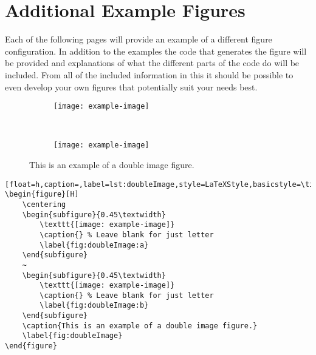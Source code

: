 \chapter{Additional Example Figures}\label{app:examplefigures}
	Each of the following pages will provide an example of a different figure configuration. 
	In addition to the examples the code that generates the figure will be provided and explanations of what the different parts of the code do will be included.
	From all of the included information in this  it should be possible to even develop your own figures that potentially suit your needs best.
		
		\clearpage



		\vspace*{\fill}
		\begin{figure}[H]
			\centering
			\begin{subfigure}{0.45\textwidth}
				\texttt{[image: example-image]}
				\caption{} %
				\label{fig:doubleImage:a}
			\end{subfigure}
			~
			\begin{subfigure}{0.45\textwidth}
				\texttt{[image: example-image]}
				\caption{} %
				\label{fig:doubleImage:b}
			\end{subfigure}
			\caption{This is an example of a double image figure.}
			\label{fig:doubleImage}
		\end{figure}
		\begin{lstlisting}[float=h,caption=,label=lst:doubleImage,style=LaTeXStyle,basicstyle=\tiny\ttfamily,]
\begin{figure}[H]
	\centering
	\begin{subfigure}{0.45\textwidth}
		\texttt{[image: example-image]}
		\caption{} % Leave blank for just letter
		\label{fig:doubleImage:a}
	\end{subfigure}
	~
	\begin{subfigure}{0.45\textwidth}
		\texttt{[image: example-image]}
		\caption{} % Leave blank for just letter
		\label{fig:doubleImage:b}
	\end{subfigure}
	\caption{This is an example of a double image figure.}
	\label{fig:doubleImage}
\end{figure}
		\end{lstlisting}
		\vspace*{\fill}
		\pagebreak



